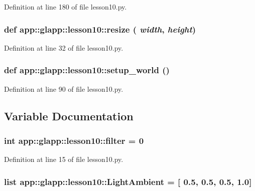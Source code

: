 Definition at line 180 of file lesson10.py.
\subsubsection{\setlength{\rightskip}{0pt plus 5cm}def app::glapp::lesson10::resize ( {\em width},  {\em height})}\label{namespaceapp_1_1glapp_1_1lesson10_d888ea753916068bfdfecbe63dc0f555}




Definition at line 32 of file lesson10.py.
\subsubsection{\setlength{\rightskip}{0pt plus 5cm}def app::glapp::lesson10::setup\_\-world ()}\label{namespaceapp_1_1glapp_1_1lesson10_1bfcab3ed21278a49ef51e44f249fc9e}




Definition at line 90 of file lesson10.py.

\subsection{Variable Documentation}
\subsubsection{\setlength{\rightskip}{0pt plus 5cm}int {\bf app::glapp::lesson10::filter} = 0\hspace{0.3cm}{\tt  [static]}}\label{namespaceapp_1_1glapp_1_1lesson10_b10287e853cb29a0d3fc062d5b3afece}




Definition at line 15 of file lesson10.py.
\subsubsection{\setlength{\rightskip}{0pt plus 5cm}list {\bf app::glapp::lesson10::LightAmbient} = [ 0.5, 0.5, 0.5, 1.0]\hspace{0.3cm}{\tt  [static]}}\label{namespaceapp_1_1glapp_1_1lesson10_e075fbe0d490e5f45d6a1587038980db}




